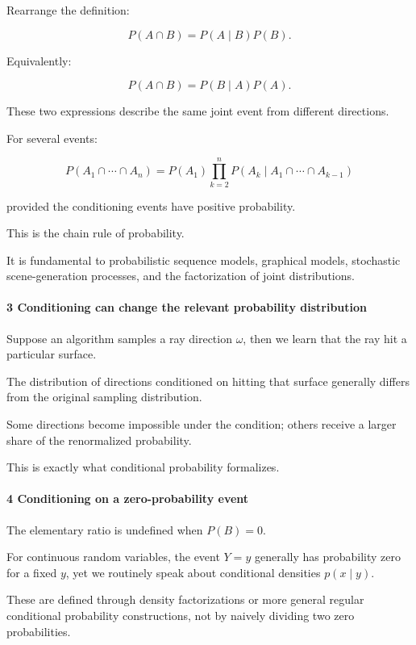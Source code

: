 Rearrange the definition:

\[
 P(A\cap B) = P(A\mid B)P(B).
\]

Equivalently:

\[
 \boxed{ P(A\cap B) = P(B\mid A)P(A) }.
\]

These two expressions describe the same joint event from different directions.

For several events:

\[
 \boxed{ P(A_1\cap\cdots\cap A_n) = P(A_1) \prod_{k=2}^{n} P(A_k\mid A_1\cap\cdots\cap A_{k-1}) }
\]

provided the conditioning events have positive probability.

This is the chain rule of probability.

It is fundamental to probabilistic sequence models, graphical models, stochastic scene-generation processes, and the factorization of joint distributions.

\paragraph{3 Conditioning can change the relevant probability distribution}\label{conditioning-can-change-the-relevant-probability-distribution}

Suppose an algorithm samples a ray direction \(\omega\), then we learn that the ray hit a particular surface.

The distribution of directions conditioned on hitting that surface generally differs from the original sampling distribution.

Some directions become impossible under the condition; others receive a larger share of the renormalized probability.

This is exactly what conditional probability formalizes.

\paragraph{4 Conditioning on a zero-probability event}\label{conditioning-on-a-zero-probability-event}

The elementary ratio is undefined when \(P(B)=0\).

For continuous random variables, the event \(Y=y\) generally has probability zero for a fixed \(y\), yet we routinely speak about conditional densities \(p(x\mid y)\).

These are defined through density factorizations or more general regular conditional probability constructions, not by naively dividing two zero probabilities.

